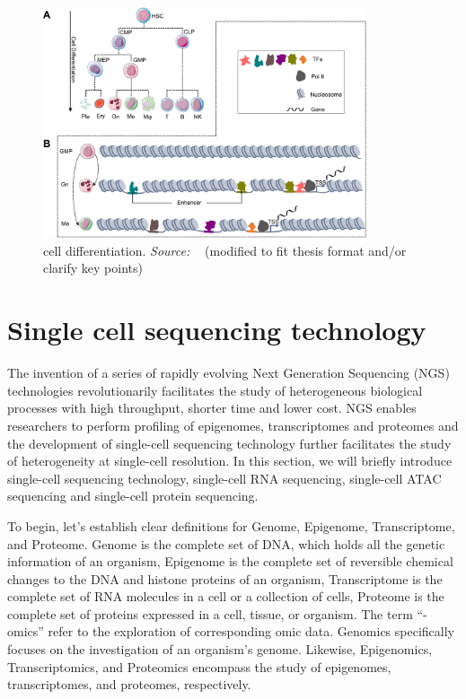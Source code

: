 \begin{figure}[!ht]
	\centering
	\includegraphics[width=0.85\textwidth]{cell_differentiation/fig}
	\vspace{0.1cm}
	\caption[cell differentiation]{cell differentiation. \emph{Source: ~\cite{costa2023dissecting}} (modified to fit thesis format and/or clarify key points)}
	\label{fig:piechart-mulitmodal-methods}
\end{figure}


\section{Single cell sequencing technology}
\label{background:profiling_singlecell}
The invention of a series of rapidly evolving Next Generation Sequencing (NGS) technologies revolutionarily facilitates the study of heterogeneous biological processes with high throughput, shorter time and lower cost\citep{svensson2018exponential}. NGS enables researchers to perform profiling of epigenomes, transcriptomes and proteomes and the development of single-cell sequencing technology further facilitates the study of heterogeneity at single-cell resolution. In this section, we will briefly introduce single-cell sequencing technology, single-cell RNA sequencing, single-cell ATAC sequencing and single-cell protein sequencing.

To begin, let's establish clear definitions for Genome, Epigenome, Transcriptome, and Proteome. Genome is the complete set of DNA, which holds all the genetic information of an organism\citep{hubbard2002genome}, Epigenome is the complete set of reversible chemical changes to the DNA and histone proteins of an organism\citep{bernstein2007epigenome}, Transcriptome is the complete set of RNA molecules in a cell or a collection of cells\citep{haoudi2006proteome}, Proteome is the complete set of proteins expressed in a cell, tissue, or organism\citep{wang2009transcriptome}. The term “-omics” refer to the exploration of corresponding omic data. Genomics specifically focuses on the investigation of an organism's genome.  Likewise, Epigenomics, Transcriptomics, and Proteomics encompass the study of epigenomes, transcriptomes, and proteomes, respectively.


